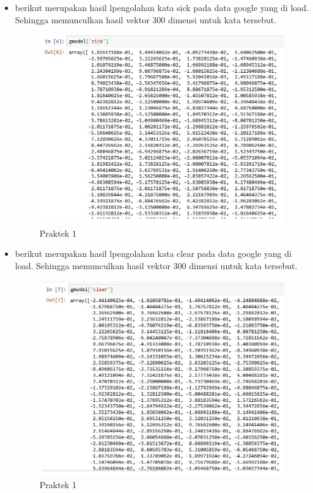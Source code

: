 \begin{enumerate}
\begin{itemize}
\item berikut merupakan hasil lpengolahan kata sick pada data google yang di load. Sehingga memunculkan hasil vektor 300 dimensi untuk kata tersebut.

\begin{figure}[ht]
\centering
\includegraphics[scale=0.6]{figures/1174008/5/2,1,4.PNG}
\caption{Praktek 1}
\end{figure}


\item berikut merupakan hasil lpengolahan kata clear pada data google yang di load. Sehingga memunculkan hasil vektor 300 dimensi untuk kata tersebut. 

\begin{figure}[ht]
\centering
\includegraphics[scale=0.6]{figures/1174008/5/2,1,5.PNG}
\caption{Praktek 1}
\end{figure}


\end{itemize}
\end{enumerate}
